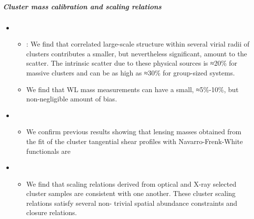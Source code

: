 \documentclass[letterpaper,10pt,english]{sphinxmanual}
\begin{document}
\subparagraph{Cluster mass calibration and scaling relations}
\label{\detokenize{resource/astro/reference/cluster_cosmology:cluster-mass-calibration-and-scaling-relations}}\begin{itemize}
\item {} 
\begin{itemize}
\item {} 
: We find that correlated large-scale structure
within several virial radii of clusters contributes a smaller, but
nevertheless significant, amount to the scatter. The intrinsic
scatter due to these physical sources is ≈20\% for massive clusters
and can be as high as ≈30\% for group-sized systems.

\item {} 
We find that WL mass measurements can have a small, ≈5\%-10\%, but
non-negligible amount of bias.

\end{itemize}

\item {} 
\begin{itemize}
\item {} 
We confirm previous results showing that lensing masses obtained
from the fit of the cluster tangential shear profiles with
Navarro-Frenk-White functionals are 

\end{itemize}

\item {} 
\begin{itemize}
\item {} 
We find that scaling relations derived from optical and X-ray
selected cluster samples are consistent with one another. These
cluster scaling relations satisfy several non- trivial spatial
abundance constraints and closure relations.

\end{itemize}

\end{itemize}
\end{document}
